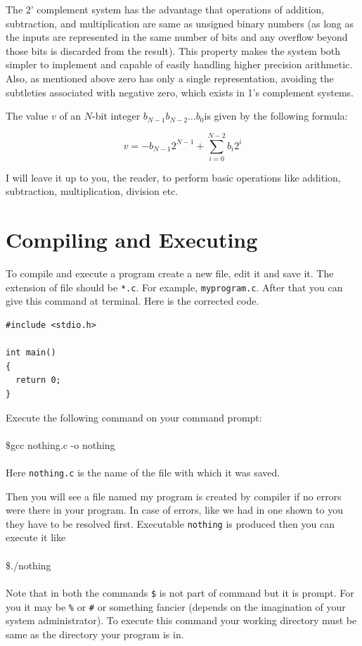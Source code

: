 The 2' complement system has the advantage that operations of addition,
subtraction, and multiplication are same as unsigned binary numbers (as long as
the inputs are represented in the same number of bits and any overflow beyond
those bits is discarded from the result). This property makes the system both
simpler to implement and capable of easily handling higher precision
arithmetic. Also, as mentioned above zero has only a single 
representation, avoiding the subtleties associated with negative zero, which
exists in 1's complement systems.

The value $v$ of an $N$-bit integer $b_{N-1} b_{N-2} \dots b_0 $is given by the
following formula:

\begin{equation}
v=-b_{N-1} 2^{N-1} + \sum_{i=0}^{N-2} b_i 2^i
\end{equation}

I will leave it up to you, the reader, to perform basic operations like
addition, subtraction, multiplication, division etc.

\section{Compiling and Executing}
To compile and execute a program create a new file, edit it and save it. The
extension of file should be \texttt{*.c}. For example,
\texttt{myprogram.c}. After that you can give this command at terminal. Here is
the corrected code.

\begin{verbatim}
#include <stdio.h>

int main()
{
  return 0;
}
\end{verbatim}

Execute the following command on your command prompt:
\\\\\$gcc nothing.c -o nothing\\\\
Here \texttt{nothing.c} is the name of the file with which it was saved.

Then you will see a file named my program is created by compiler if no errors
were there in your program. In case of errors, like we had in one shown to you
they have to be resolved first. Executable \texttt{nothing} is produced then
you can execute it like
\\\\\$./nothing\\\\
Note that in both the commands \texttt{\$} is not part of command but it is
prompt. For you it may be \texttt{\%} or \texttt{\#} or something fancier
(depends on the imagination of your system administrator). To execute this
command your working directory must be same as the directory your program is
in.

